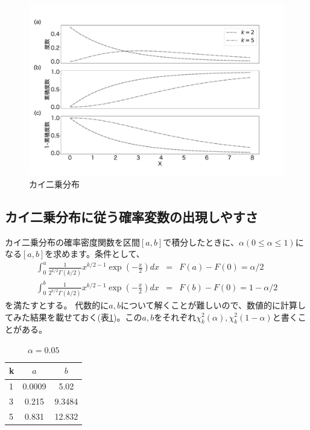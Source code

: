 \begin{figure}
    \begin{center}
        \includegraphics[width=15cm]{./image/02_/chi2_frequency.pdf}
        \caption{カイ二乗分布}
        \label{chi2_}
    \end{center}
\end{figure}

\subsection{カイ二乗分布に従う確率変数の出現しやすさ}
カイ二乗分布の確率密度関数を区間$[a,b]$で積分したときに、$\alpha(0\leq \alpha \leq 1)$になる$[a,b]$を求めます。条件として、
\begin{eqnarray*}
    \int_0^{a}  \frac{1}{2^{k/2}\Gamma(k/2)}x^{k/2-1}\exp\left(-\frac{x}{2}\right)dx &=& F(a)-F(0) = \alpha/2\\
    \int_0^{b} \frac{1}{2^{k/2}\Gamma(k/2)}x^{k/2-1}\exp\left(-\frac{x}{2}\right)dx &=& F(b)-F(0)= 1-\alpha/2
\end{eqnarray*}
を満たすとする。
代数的に$a,b$について解くことが難しいので、数値的に計算してみた結果を載せておく(表\ref{table:chi2_confidence})。この$a,b$をそれぞれ$\chi^2_k(\alpha),\chi^2_{k}(1-\alpha)$と書くことがある。


\begin{table}[hbtp]
    \caption{$\alpha=0.05$}
    \label{table:chi2_confidence}
    \centering
    \begin{tabular}{lcc}
    k  & $a$   & $b$   \\
    \hline \hline
    1 &  0.0009 &  5.02\\
    3 & 0.215 & 9.3484  \\
    5 &  0.831 & 12.832 \\
      \hline
    \end{tabular}
  \end{table}

